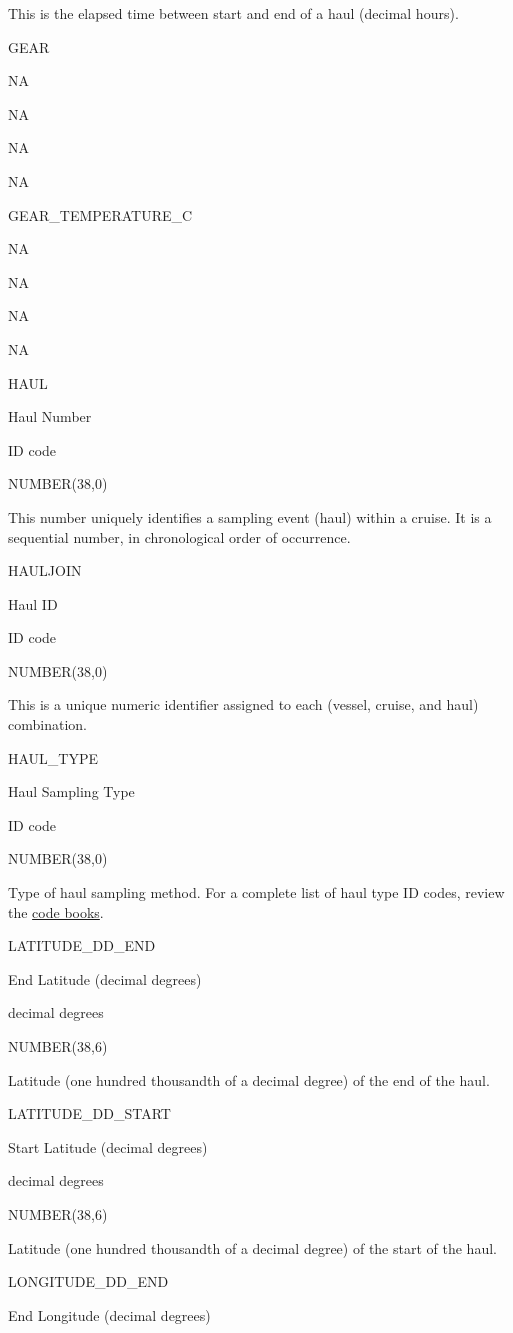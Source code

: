 \documentclass[
  letterpaper,
  oneside,
  open=any]{scrbook}
\begin{document}
This is the elapsed time between start and end of a haul (decimal
hours).

GEAR

NA

NA

NA

NA

GEAR\_TEMPERATURE\_C

NA

NA

NA

NA

HAUL

Haul Number

ID code

NUMBER(38,0)

This number uniquely identifies a sampling event (haul) within a cruise.
It is a sequential number, in chronological order of occurrence.

HAULJOIN

Haul ID

ID code

NUMBER(38,0)

This is a unique numeric identifier assigned to each (vessel, cruise,
and haul) combination.

HAUL\_TYPE

Haul Sampling Type

ID code

NUMBER(38,0)

Type of haul sampling method. For a complete list of haul type ID codes,
review the
\href{https://www.fisheries.noaa.gov/resource/document/groundfish-survey-species-code-manual-and-data-codes-manual}{code
books}.

LATITUDE\_DD\_END

End Latitude (decimal degrees)

decimal degrees

NUMBER(38,6)

Latitude (one hundred thousandth of a decimal degree) of the end of the
haul.

LATITUDE\_DD\_START

Start Latitude (decimal degrees)

decimal degrees

NUMBER(38,6)

Latitude (one hundred thousandth of a decimal degree) of the start of
the haul.

LONGITUDE\_DD\_END

End Longitude (decimal degrees)
\end{document}
